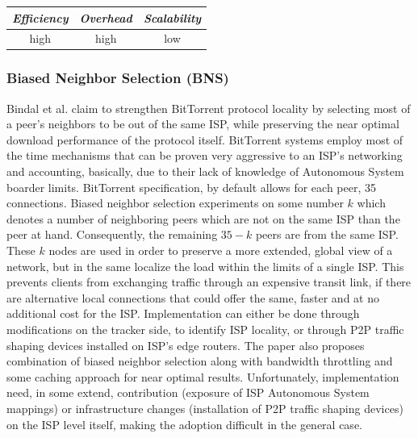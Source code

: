 \begin{center}
\begin{tabular}{ccc}
\emph{Efficiency} & \emph{Overhead} & \emph{Scalability} \\
\hline
high &
high &
low
\end{tabular}
\end{center}

\subsubsection{Biased Neighbor Selection (BNS)}
Bindal et al. \cite{BCCMSBZ2006} claim to strengthen BitTorrent
protocol\cite{c_bittorrent_2003} locality by selecting most of a peer's
neighbors to be out of the same ISP, while preserving the near optimal download
performance of the protocol itself. BitTorrent systems employ most of the time
mechanisms that can be proven very aggressive to an ISP's networking and
accounting, basically, due to their lack of knowledge of Autonomous System
boarder limits. BitTorrent specification, by default allows for each peer, 35
connections. Biased neighbor selection experiments on some number $k$ which
denotes a number of neighboring peers which are not on the same ISP than the
peer at hand. Consequently, the remaining $35 - k$ peers are from the same ISP.
These $k$ nodes are used in order to preserve a more extended, global view of a
network, but in the same localize the load within the limits of a single ISP.
This prevents clients from exchanging traffic through an expensive transit link,
if there are alternative local connections that could offer the same, faster and
at no additional cost for the ISP. Implementation can either be done through
modifications on the tracker side, to identify ISP locality, or through P2P
traffic shaping devices installed on ISP's edge routers. The paper also proposes
combination of biased neighbor selection along with bandwidth throttling and
some caching approach for near optimal results. Unfortunately, implementation
need, in some extend, contribution (exposure of ISP Autonomous System mappings)
or infrastructure changes (installation of P2P traffic shaping devices) on the
ISP level itself, making the adoption difficult in the general case.

